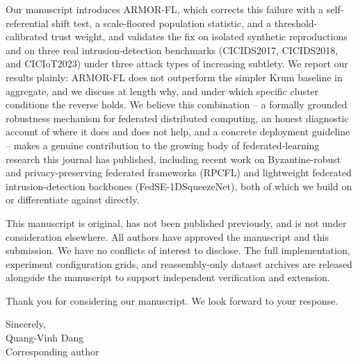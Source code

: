 \documentclass[10.5pt]{article}
\begin{document}
Our manuscript introduces ARMOR-FL, which corrects this failure with a self-referential shift test, a scale-floored population statistic, and a threshold-calibrated trust weight, and validates the fix on isolated synthetic reproductions and on three real intrusion-detection benchmarks (CICIDS2017, CICIDS2018, and CICIoT2023) under three attack types of increasing subtlety. We report our results plainly: ARMOR-FL does not outperform the simpler Krum baseline in aggregate, and we discuss at length why, and under which specific cluster conditions the reverse holds. We believe this combination -- a formally grounded robustness mechanism for federated distributed computing, an honest diagnostic account of where it does and does not help, and a concrete deployment guideline -- makes a genuine contribution to the growing body of federated-learning research this journal has published, including recent work on Byzantine-robust and privacy-preserving federated frameworks (RPCFL) and lightweight federated intrusion-detection backbones (FedSE-1DSqueezeNet), both of which we build on or differentiate against directly.

This manuscript is original, has not been published previously, and is not under consideration elsewhere. All authors have approved the manuscript and this submission. We have no conflicts of interest to disclose. The full implementation, experiment configuration grids, and reassembly-only dataset archives are released alongside the manuscript to support independent verification and extension.

Thank you for considering our manuscript. We look forward to your response.

\vspace{0.4cm}
\noindent Sincerely,\\[0.2cm]
Quang-Vinh Dang\\
Corresponding author
\end{document}
